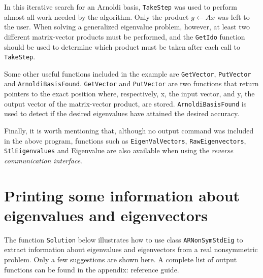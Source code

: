 In this iterative search for an Arnoldi basis, \texttt{TakeStep} was used to perform almost all work needed by the algorithm. Only the product $y\leftarrow Ax$ was left to the user. When solving a generalized eigenvalue problem, however, at least two different matrix-vector products must be performed, and the \texttt{GetIdo} function should be used to determine which product must be taken after each call to \texttt{TakeStep}.

Some other useful \ARPP{} functions included in the example are \texttt{GetVector}, \texttt{PutVector} and \texttt{ArnoldiBasisFound}. \texttt{GetVector} and \texttt{PutVector} are two functions that return pointers to the exact position where, respectively, x, the input vector, and y, the output vector of the matrix-vector product, are stored. \texttt{ArnoldiBasisFound} is used to detect if the desired eigenvalues have attained the desired accuracy.

Finally, it is worth mentioning that, although no output command was included in the above program, functions such as \texttt{EigenValVectors}, \texttt{RawEigenvectors}, \texttt{StlEigenvalues} and Eigenvalue are also available when using the \textit{reverse communication interface}.

\section{Printing some information about eigenvalues and eigenvectors}

The function \texttt{Solution} below illustrates how to use class \texttt{ARNonSymStdEig} to extract information about eigenvalues and eigenvectors from a real nonsymmetric problem. Only a few suggestions are shown here. A complete list of \ARPP{} output functions can be found in the appendix: \ARPP{} reference guide.

